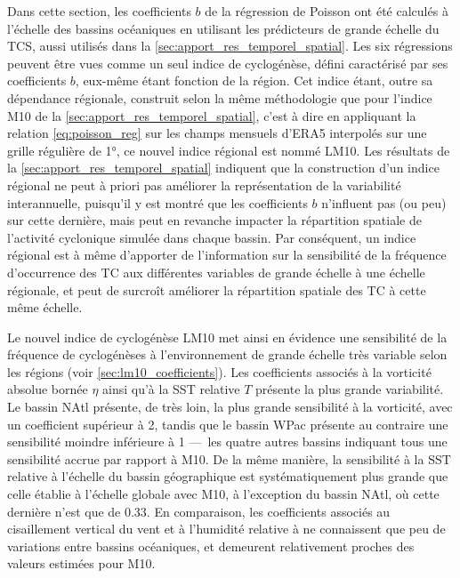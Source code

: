 \documentclass[../main.tex]{subfiles}
\begin{document}
Dans cette section, les coefficients $b$ de la régression de Poisson ont été calculés à l'échelle des bassins océaniques en utilisant les prédicteurs de grande
échelle du TCS, aussi utilisés dans la \cref{sec:apport_res_temporel_spatial}. Les six régressions peuvent être vues comme un seul indice de cyclogénèse, défini
caractérisé par ses coefficients $b$, eux-même étant fonction de la région. Cet indice étant, outre sa dépendance régionale, construit selon la même
méthodologie que pour l'indice M10 de la \cref{sec:apport_res_temporel_spatial}, c'est à dire en appliquant la relation \ref{eq:poisson_reg} sur les champs
mensuels d'ERA5 interpolés sur une grille régulière de \ang{1}, ce nouvel indice régional est nommé LM10. Les résultats de la
\cref{sec:apport_res_temporel_spatial} indiquent que la construction d'un indice régional ne peut à priori pas améliorer la représentation de la variabilité
interannuelle, puisqu'il y est montré que les coefficients $b$ n'influent pas (ou peu) sur cette dernière, mais peut en revanche impacter la répartition
spatiale de l'activité cyclonique simulée dans chaque bassin. Par conséquent, un indice régional est à même d'apporter de l'information sur la sensibilité de la
fréquence d'occurrence des TC aux différentes variables de grande échelle à une échelle régionale, et peut de surcroît améliorer la répartition spatiale des TC
à cette même échelle.

Le nouvel indice de cyclogénèse LM10 met ainsi en évidence une sensibilité de la fréquence de cyclogénèses à l'environnement de grande échelle très variable
selon les régions (voir \cref{sec:lm10_coefficients}). Les coefficients associés à la vorticité absolue bornée $\eta$ ainsi qu'à la SST relative $T$ présente la
plus grande variabilité. Le bassin NAtl présente, de très loin, la plus grande sensibilité à la vorticité, avec un coefficient supérieur à \num{2}, tandis que
le bassin WPac présente au contraire une sensibilité moindre inférieure à \num{1} ---~les quatre autres bassins indiquant tous une sensibilité accrue par
rapport à M10. De la même manière, la sensibilité à la SST relative à l'échelle du bassin géographique est systématiquement plus grande que celle établie à
l'échelle globale avec M10, à l'exception du bassin NAtl, où cette dernière n'est que de \num{0.33}. En comparaison, les coefficients associés au cisaillement
vertical du vent et à l'humidité relative à  ne connaissent que peu de variations entre bassins océaniques, et demeurent relativement proches des
valeurs estimées pour M10.
\end{document}
